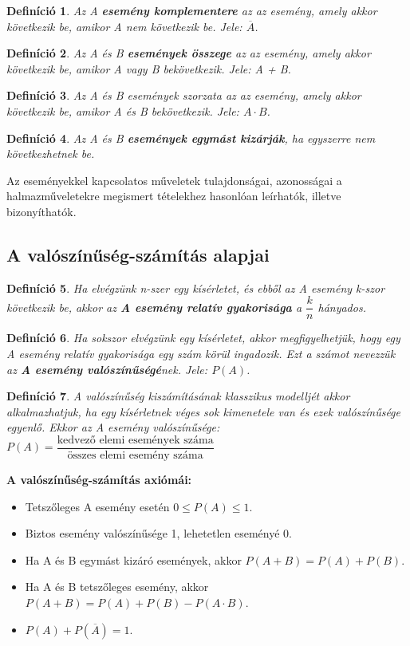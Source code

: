 \documentclass[12pt,a4paper]{article}
\newtheorem{definition}{Definíció} [section]
\begin{document}
\begin{definition}
Az A \textbf{esemény komplementere} az az esemény, amely akkor következik be, amikor A nem következik be. Jele: $\overline{A}$.
\end{definition}

\begin{definition}
Az A és B \textbf{események összege} az az esemény, amely akkor következik be, amikor A vagy B bekövetkezik. Jele: A + B.
\end{definition}

\begin{definition}
Az A és B események szorzata az az esemény, amely akkor következik be, amikor A és B bekövetkezik. Jele: $A \cdot B$.
\end{definition}

\begin{definition}
Az A és B \textbf{események egymást kizárják}, ha egyszerre nem következhetnek be.
\end{definition}
Az eseményekkel kapcsolatos műveletek tulajdonságai, azonosságai a halmazműveletekre megismert tételekhez hasonlóan leírhatók, illetve bizonyíthatók.	

\subsection{A valószínűség-számítás alapjai}

\begin{definition}
Ha elvégzünk n-szer egy kísérletet, és ebből az A esemény k-szor következik be, akkor
az \textbf{A esemény relatív gyakorisága} a $\dfrac{k}{n}$ hányados.
\end{definition}

\begin{definition}
Ha sokszor elvégzünk egy kísérletet, akkor megfigyelhetjük, hogy egy A esemény relatív gyakorisága egy szám körül ingadozik. Ezt a számot nevezzük az \textbf{A esemény valószínűségé}nek. Jele: $P(A)$.
\end{definition}

\begin{definition}
A valószínűség kiszámításának klasszikus modelljét akkor alkalmazhatjuk, ha egy kísérletnek véges sok kimenetele van és ezek valószínűsége egyenlő. Ekkor az A esemény valószínűsége: $P(A)=\dfrac{\text{kedvező elemi események száma}}{\text{összes elemi esemény száma}}$
\end{definition}

\textbf{A valószínűség-számítás axiómái:}
\begin{itemize}
\item Tetszőleges A esemény esetén $0\leq P(A)\leq 1$.
\item Biztos esemény valószínűsége 1, lehetetlen eseményé 0.
\item Ha A és B egymást kizáró események, akkor $P(A+B)=P(A)+P(B)$.
\item  Ha A és B tetszőleges esemény, akkor $P(A+B)=P(A)+P(B)-P(A\cdot B)$.
\item $P(A)+P(\overline{A})=1$.
\end{itemize}
\end{document}

